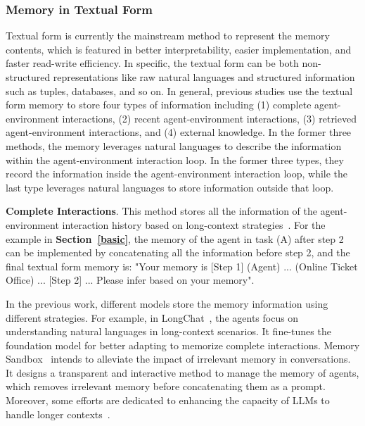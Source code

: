 \documentclass{article}
\theoremstyle{definition}
\theoremstyle{theorem}
\theoremstyle{proof}
\theoremstyle{remark}
\begin{document}
	\subsubsection{Memory in Textual Form}
	Textual form is currently the mainstream method to represent the memory contents, which is featured in better interpretability, easier implementation, and faster read-write efficiency.
	In specific, the textual form can be both non-structured representations like raw natural languages and structured information such as tuples, databases, and so on. 
	In general, previous studies use the textual form memory to store four types of information including (1) complete agent-environment interactions, (2) recent agent-environment interactions, (3) retrieved agent-environment interactions, and (4) external knowledge.
	In the former three methods, the memory leverages natural languages to describe the information within the agent-environment interaction loop.
	In the former three types, they record the information inside the agent-environment interaction loop, while the last type leverages natural languages to store information outside that loop.
	
	\textbf{Complete Interactions}.
	This method stores all the information of the agent-environment interaction history based on long-context strategies~\cite{longchat}.
	For the example in \textbf{Section~\ref{basic}},  the memory of the agent in task (A) after step 2 can be implemented by concatenating all the information before step 2, and the final textual form memory is: "Your memory is [Step 1] (Agent) ... (Online Ticket Office) ... [Step 2] ... Please infer based on your memory". 
	
	In the previous work, different models store the memory information using different strategies.
	For example, in LongChat~\cite{longchat}, the agents focus on understanding natural languages in long-context scenarios. It fine-tunes the foundation model for better adapting to memorize complete interactions.
	Memory Sandbox~\cite{memory_sandbox} intends to alleviate the impact of irrelevant memory in conversations. It designs a transparent and interactive method to manage the memory of agents, which removes irrelevant memory before concatenating them as a prompt.
	Moreover, some efforts are dedicated to enhancing the capacity of LLMs to handle longer contexts~\cite{giraffe,longllama}.
	
\end{document}
